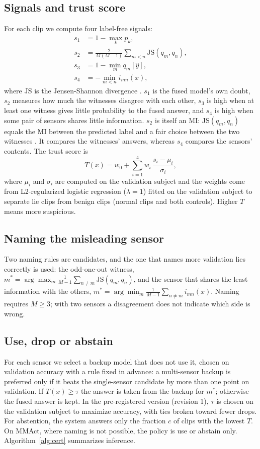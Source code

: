 \documentclass[conference]{IEEEtran}
\begin{document}
\subsection{Signals and trust score}
For each clip we compute four label-free signals:
\begin{align}
s_1 &= 1-\max_k p_k, \label{eq:s1}\\
s_2 &= \frac{2}{M(M-1)}\sum_{m<n}\mathrm{JS}(q_m,q_n), \label{eq:s2}\\
s_3 &= 1-\min_m q_m[\hat{y}], \label{eq:s3}\\
s_4 &= -\min_{m<n} i_{mn}(x), \label{eq:s4}
\end{align}
where $\mathrm{JS}$ is the Jensen-Shannon divergence \cite{Ref13}. $s_1$ is the fused model's own doubt, $s_2$ measures how much the witnesses disagree with each other, $s_3$ is high when at least one witness gives little probability to the fused answer, and $s_4$ is high when some pair of sensors shares little information. $s_2$ is itself an MI: $\mathrm{JS}(q_m,q_n)$ equals the MI between the predicted label and a fair choice between the two witnesses \cite{Ref13}. It compares the witnesses' answers, whereas $s_4$ compares the sensors' contents. The trust score is
\begin{equation}
T(x)=w_0+\sum_{i=1}^{4} w_i\,\frac{s_i-\mu_i}{\sigma_i},
\end{equation}
where $\mu_i$ and $\sigma_i$ are computed on the validation subject and the weights come from L2-regularized logistic regression ($\lambda=1$) fitted on the validation subject to separate lie clips from benign clips (normal clips and both controls). Higher $T$ means more suspicious.

\subsection{Naming the misleading sensor}
Two naming rules are candidates, and the one that names more validation lies correctly is used: the odd-one-out witness, $m^{\ast}=\arg\max_m \frac{1}{M-1}\sum_{n\neq m}\mathrm{JS}(q_m,q_n)$, and the sensor that shares the least information with the others, $m^{\ast}=\arg\min_m \frac{1}{M-1}\sum_{n\neq m} i_{mn}(x)$. Naming requires $M\geq 3$; with two sensors a disagreement does not indicate which side is wrong.

\subsection{Use, drop or abstain}
For each sensor we select a backup model that does not use it, chosen on validation accuracy with a rule fixed in advance: a multi-sensor backup is preferred only if it beats the single-sensor candidate by more than one point on validation. If $T(x)\geq\tau$ the answer is taken from the backup for $m^{\ast}$; otherwise the fused answer is kept. In the pre-registered version (revision 1), $\tau$ is chosen on the validation subject to maximize accuracy, with ties broken toward fewer drops. For abstention, the system answers only the fraction $c$ of clips with the lowest $T$. On MMAct, where naming is not possible, the policy is use or abstain only. Algorithm~\ref{alg:cert} summarizes inference.
\end{document}
